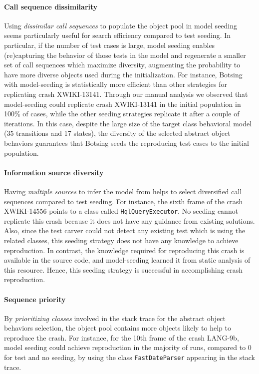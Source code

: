 \paragraph{Call sequence dissimilarity}
Using \emph{dissimilar call sequences} to populate the object pool in model seeding seems particularly useful for search efficiency compared to test seeding. In particular, if the number of test cases is large, model seeding enables (re)capturing the behavior of those tests in the model and regenerate a smaller set of call sequences which maximize diversity, augmenting the probability to have more diverse objects used during the initialization. For instance, Botsing with model-seeding is statistically more efficient than other strategies for replicating crash XWIKI-13141. Through our manual analysis we observed that model-seeding could replicate crash XWIKI-13141 in the initial population in 100\% of cases, while the other seeding strategies replicate it after a couple of iterations. In this case, despite the large size of the target class behavioral model  (35 transitions and 17 states), the diversity of the selected abstract object behaviors guarantees that Botsing seeds the reproducing test cases to the initial population.

\paragraph{Information source diversity}
Having \emph{multiple sources} to infer the model from helps to select diversified call sequences compared to test seeding. For instance, the sixth frame of the crash XWIKI-14556 points to a class called \texttt{HqlQueryExecutor}. No seeding cannot replicate this crash because it does not have any guidance from existing solutions. Also, since the test carver could not detect any existing test which is using the related classes, this seeding strategy does not have any knowledge to achieve reproduction. In contrast, the knowledge required for reproducing this crash is available in the source code, and model-seeding learned it from static analysis of this resource. Hence, this seeding strategy is successful in accomplishing crash reproduction.

\paragraph{Sequence priority}
By \emph{prioritizing classes} involved in the stack trace for the abstract object behaviors selection, the object pool contains more objects likely to help to reproduce the crash. For instance, for the 10th frame of the crash LANG-9b, model seeding could achieve reproduction in the majority of runs, compared to 0 for test and no seeding, by using the class \texttt{Fast\-Date\-Parser} appearing in the stack trace.

